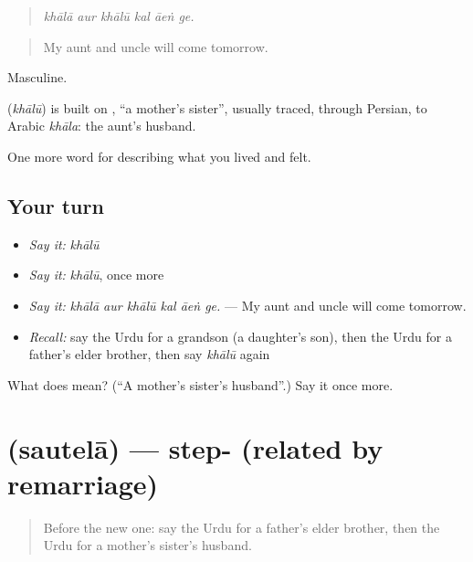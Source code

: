 \begin{quote}
\emph{khālā aur khālū kal āeṅ ge.}
\end{quote}

\begin{quote}
My aunt and uncle will come tomorrow.
\end{quote}

Masculine.

\begin{cousinweb}
\textbf{} (\emph{khālū}) is built on \textbf{}, \textquotedblleft{}a mother's sister\textquotedblright{}, usually traced, through Persian, to Arabic \emph{khāla}: the aunt's husband.
\end{cousinweb}

\begin{grammarlens}[title={What you've built}]
One more word for describing what you lived and felt.
\end{grammarlens}

\subsection*{Your turn}
\begin{itemize}
\raggedright
  \item \emph{Say it:} \emph{khālū}
  \item \emph{Say it:} \emph{khālū}, once more
  \item \emph{Say it:} \emph{khālā aur khālū kal āeṅ ge.} — My aunt and uncle will come tomorrow.
  \item \emph{Recall:} say the Urdu for a grandson (a daughter's son), then the Urdu for a father's elder brother, then say \emph{khālū} again
\end{itemize}

\begin{tcolorbox}[breakable,colback=teal!4,colframe=teal!35!black,title={Before you move on}]
What does  mean? (\textquotedblleft{}A mother's sister's husband\textquotedblright{}.) Say it once more.
\end{tcolorbox}
\section[\texorpdfstring{\ur{سوتیلا} (sautelā)}{سوتیلا (sautelā)}]{ (sautelā) — step- (related by remarriage)}

\label{lesson:UR-C490-sautela}



\begin{quote}
Before the new one: say the Urdu for a father's elder brother, then the Urdu for a mother's sister's husband.
\end{quote}

